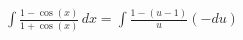 \documentclass[preview]{standalone}
\begin{document}
\begin{align*}
\int \frac{1 - \cos(x)}{1 + \cos(x)} \, dx = \int \frac{1 - (u - 1)}{u} (-du)
\end{align*}
\end{document}
